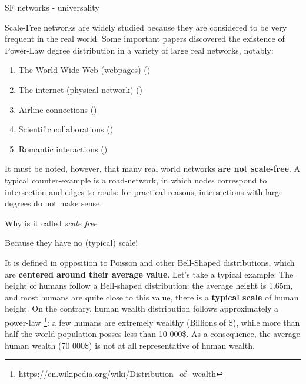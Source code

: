 \documentclass[a4paper,11pt]{book}
\begin{document}
\begin{textbox}{SF networks - universality}

Scale-Free networks are widely studied because they are considered to be very frequent in the real world. Some important papers discovered the existence of Power-Law degree distribution in a variety of large real networks, notably:
\begin{enumerate}
    \item The World Wide Web (webpages) (\cite{barabasi1999emergence})
    \item The internet (physical network) (\cite{faloutsos1999power})
    \item Airline connections (\cite{guimera2004modeling})
    \item Scientific collaborations (\cite{newman2001structure})
    \item Romantic interactions (\cite{liljeros2001web})
\end{enumerate}

It must be noted, however, that many real world networks \textbf{are not scale-free}. A typical counter-example is a road-network, in which nodes correspond to intersection and edges to roads: for practical reasons, intersections with large degrees do not make sense.

\end{textbox}






\begin{textbox}{Why is it called \textit{scale free}}

Because they have no (typical) scale! 

It is defined in opposition to Poisson and other Bell-Shaped distributions, which are \textbf{centered around their average value}. Let's take a typical example: The height of humans follow a Bell-shaped distribution: the average height is 1.65m, and most humans are quite close to this value, there is a \textbf{typical scale} of human height. On the contrary, human wealth distribution follows approximately a power-law \footnote{ \url{https://en.wikipedia.org/wiki/Distribution_of_wealth}}: a few humans are extremely wealthy (Billions of \$), while more than half the world population posses less than 10 000\$. As a consequence, the average human wealth (70 000\$) is not at all representative of human wealth.


\end{textbox}
\end{document}
